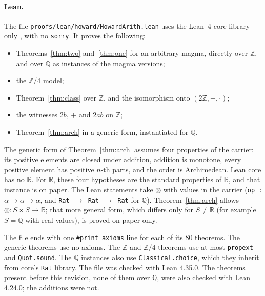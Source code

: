 \documentclass[11pt]{article}
\theoremstyle{remark}
\begin{document}
\paragraph{Lean.} The file \texttt{proofs/lean/howard/HowardArith.lean} uses the Lean~4 core library only \cite{Lean4}, with no \texttt{sorry}. It proves the following:
\begin{itemize}
\item Theorems~\ref{thm:two} and~\ref{thm:one} for an arbitrary magma, directly over $\mathbb Z$, and over $\mathbb Q$ as instances of the magma versions;
\item the $\mathbb Z/4$ model;
\item Theorem~\ref{thm:class} over $\mathbb Z$, and the isomorphism onto $(2\mathbb Z,+,\cdot)$;
\item the witnesses $2b$, $+$ and $2ab$ on $\mathbb Z$;
\item Theorem~\ref{thm:arch} in a generic form, instantiated for $\mathbb Q$.
\end{itemize}
The generic form of Theorem~\ref{thm:arch} assumes four properties of the carrier: its positive elements are closed under addition, addition is monotone, every positive element has positive $n$-th parts, and the order is Archimedean. Lean core has no $\mathbb R$. For $\mathbb R$, these four hypotheses are the standard properties of $\mathbb R$, and that instance is on paper. The Lean statements take $\otimes$ with values in the carrier (\texttt{op : $\alpha\to\alpha\to\alpha$}, and \texttt{Rat $\to$ Rat $\to$ Rat} for $\mathbb Q$). Theorem~\ref{thm:arch} allows $\otimes:S\times S\to\mathbb R$; that more general form, which differs only for $S\neq\mathbb R$ (for example $S=\mathbb Q$ with real values), is proved on paper only.

The file ends with one \texttt{\#print axioms} line for each of its 80 theorems. The generic theorems use no axioms. The $\mathbb Z$ and $\mathbb Z/4$ theorems use at most \texttt{propext} and \texttt{Quot.sound}. The $\mathbb Q$ instances also use \texttt{Classical.choice}, which they inherit from core's \texttt{Rat} library. The file was checked with Lean 4.35.0. The theorems present before this revision, none of them over $\mathbb Q$, were also checked with Lean 4.24.0; the additions were not.
\end{document}
